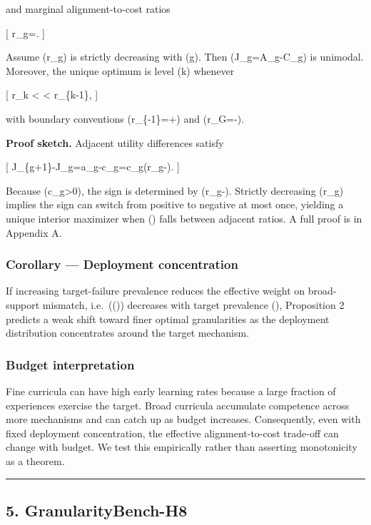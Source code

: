 \documentclass[
]{article}
\begin{document}
and marginal alignment-to-cost ratios

{[} r\_g=. {]}

Assume (r\_g) is strictly decreasing with (g). Then
(J\_g=A\_g-\lambda C\_g) is unimodal. Moreover, the unique optimum is
level (k) whenever

{[} r\_k \textless{} \lambda \textless{} r\_\{k-1\}, {]}

with boundary conventions (r\_\{-1\}=+\infty) and (r\_G=-\infty).

\textbf{Proof sketch.} Adjacent utility differences satisfy

{[} J\_\{g+1\}-J\_g=a\_g-\lambda c\_g=c\_g(r\_g-\lambda). {]}

Because (c\_g\textgreater0), the sign is determined by (r\_g-\lambda).
Strictly decreasing (r\_g) implies the sign can switch from positive to
negative at most once, yielding a unique interior maximizer when
(\lambda) falls between adjacent ratios. A full proof is in Appendix A.

\subsubsection{Corollary --- Deployment
concentration}\label{corollary-deployment-concentration}

If increasing target-failure prevalence reduces the effective weight on
broad-support mismatch, i.e.~(\lambda(\rho)) decreases with target
prevalence (\rho), Proposition 2 predicts a weak shift toward finer
optimal granularities as the deployment distribution concentrates around
the target mechanism.

\subsubsection{Budget interpretation}\label{budget-interpretation}

Fine curricula can have high early learning rates because a large
fraction of experiences exercise the target. Broad curricula accumulate
competence across more mechanisms and can catch up as budget increases.
Consequently, even with fixed deployment concentration, the effective
alignment-to-cost trade-off can change with budget. We test this
empirically rather than asserting monotonicity as a theorem.

\begin{center}\rule{0.5\linewidth}{0.5pt}\end{center}

\subsection{5. GranularityBench-H8}\label{granularitybench-h8}
\end{document}
